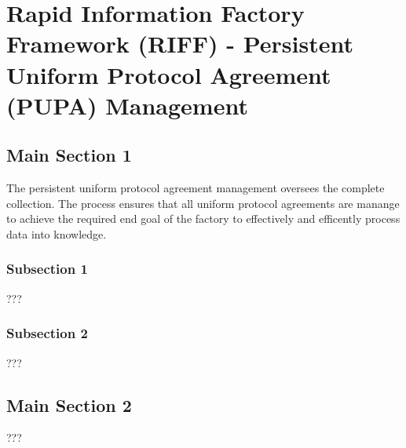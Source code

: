 
\chapter{Rapid Information Factory Framework (RIFF) - Persistent Uniform Protocol Agreement (PUPA) Management} %

\label{Chapter22} %



\section{Main Section 1}

The persistent uniform protocol agreement management oversees the complete collection. The process ensures that all uniform protocol agreements are manange to achieve the required end goal of the factory to effectively and efficently process data into knowledge.

\subsection{Subsection 1}

???


\subsection{Subsection 2}

???


\section{Main Section 2}

???
